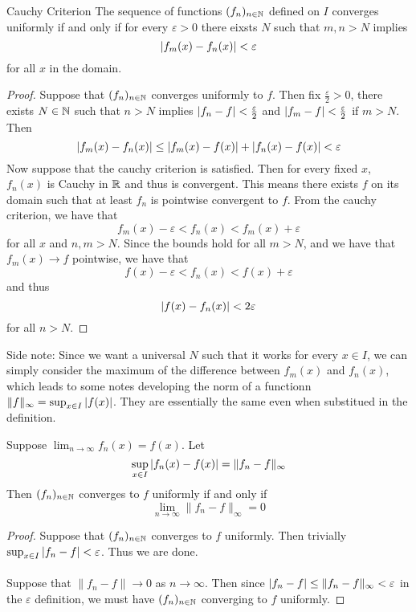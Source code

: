 \documentclass[a4paper]{article}
\begin{document}
\begin{thm}{Cauchy Criterion}{} The sequence of functions $(f_n)_{n\in\mathbb{N}}$ defined on $I$ converges uniformly if and only if for every $\varepsilon>0$ there eixsts $N$ such that $m,n>N$ implies $$\abs{f_m(x)-f_n(x)}<\varepsilon$$ for all $x$ in the domain. \tcbline
\begin{proof}
Suppose that $(f_n)_{n\in\mathbb{N}}$ converges uniformly to $f$. Then fix $\frac{\varepsilon}{2}>0$, there exists $N\in\mathbb{N}$ such that $n>N$ implies $\abs{f_n-f}<\frac{\varepsilon}{2}$ and $\abs{f_m-f}<\frac{\varepsilon}{2}$ if $m>N$. Then $$\abs{f_m(x)-f_n(x)}\leq\abs{f_m(x)-f(x)}+\abs{f_n(x)-f(x)}<\varepsilon$$
Now suppose that the cauchy criterion is satisfied. Then for every fixed $x$, $f_n(x)$ is Cauchy in $\mathbb{R}$ and thus is convergent. This means there exists $f$ on its domain such that at least $f_n$ is pointwise convergent to $f$. From the cauchy criterion, we have that $$f_m(x)-\varepsilon<f_n(x)<f_m(x)+\varepsilon$$ for all $x$ and $n,m>N$. Since the bounds hold for all $m>N$, and we have that $f_m(x)\to f$ pointwise, we have that $$f(x)-\varepsilon<f_n(x)<f(x)+\varepsilon$$ and thus $$\abs{f(x)-f_n(x)}<2\varepsilon$$ for all $n>N$. 
\end{proof}
\end{thm}

Side note: Since we want a universal $N$ such that it works for every $x\in I$, we can simply consider the maximum of the difference between $f_m(x)$ and $f_n(x)$, which leads to some notes developing the norm of a functionn $\|f\|_{\infty}=\sup_{x\in I}\abs{f(x)}$. They are essentially the same even when substitued in the definition. 

\begin{prp}{}{} Suppose $\lim_{n\to\infty}f_n(x)=f(x)$. Let $$\sup_{x\in I}\abs{f_n(x)-f(x)}=\|f_n-f\|_\infty$$ Then $(f_n)_{n\in\mathbb{N}}$ converges to $f$ uniformly if and only if $$\lim_{n\to\infty}\|f_n-f\|_\infty=0$$ \tcbline
\begin{proof}
Suppose that $(f_n)_{n\in\mathbb{N}}$ converges to $f$ uniformly. Then trivially $\sup_{x\in I}\abs{f_n-f}<\varepsilon$. Thus we are done. \\~\\
Suppose that $\|f_n-f\|\to 0$ as $n\to\infty$. Then since $\abs{f_n-f}\leq\|f_n-f\|_\infty<\varepsilon$ in the $\varepsilon$ definition, we must have $(f_n)_{n\in\mathbb{N}}$ converging to $f$ uniformly. 
\end{proof}
\end{prp}
\end{document}
